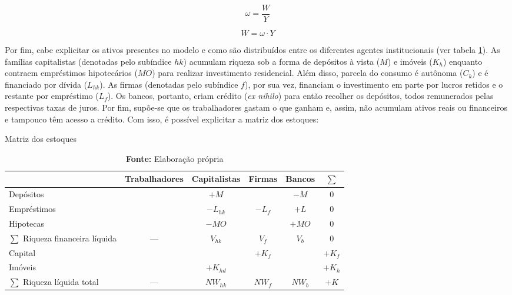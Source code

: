 
$$
\omega = \frac{W}{Y}
$$

\begin{equation}
\label{_W}
    W = \omega\cdot Y
\end{equation}

Por fim, cabe explicitar os ativos presentes no modelo e como são distribuídos entre os diferentes agentes institucionais (ver tabela \ref{Matriz_Estoques}). As famílias capitalistas (denotadas pelo subíndice $hk$) acumulam riqueza sob a forma de depósitos à vista ($M$) e imóveis ($K_h$) enquanto contraem empréstimos hipotecários ($MO$) para realizar investimento residencial.
Além disso, parcela do consumo é autônoma ($C_k$) e é financiado por dívida ($L_{hk}$).
As firmas (denotadas pelo subíndice $f$), por sua vez, financiam o investimento em parte por lucros retidos e o restante por empréstimo ($L_f$). Os bancos, portanto, criam crédito (\textit{ex nihilo}) para então recolher os depósitos, todos remunerados pelas respectivas taxas de juros. 
Por fim, supõe-se que os trabalhadores gastam o que ganham e, assim, não acumulam ativos reais ou financeiros e tampouco têm acesso a crédito.
Com isso, é possível explicitar a matriz dos estoques:


\begin{table}[H]
\centering
\caption{Matriz dos estoques}
\label{Matriz_Estoques}
\begin{tabular}{lccccc}
\hline
\hline


                          & Trabalhadores & Capitalistas      & Firmas        & Bancos  &    $\sum$ \\ \hline

Depósitos & & $+M$ & & $-M$ & 0\\
Empréstimos& &$-L_{hk}$ &$-L_f$& $+L$ & 0\\
Hipotecas & &$-MO$&  & $+MO$ & 0\\\hline
$\sum$ Riqueza financeira líquida &--- &$V_{hk}$&$V_f$&$V_b$& $0$\\\hline
Capital & & &$+K_f$&  & $+K_f$\\
Imóveis & &$+K_{hd}$& &   & $+K_h$\\\hline
$\sum$ Riqueza líquida total &---&$NW_{hk}$&$NW_f$&$NW_b$& $+K$\\
\hline
\hline
\end{tabular}%
\caption*{\textbf{Fonte:} Elaboração própria}
\end{table}

